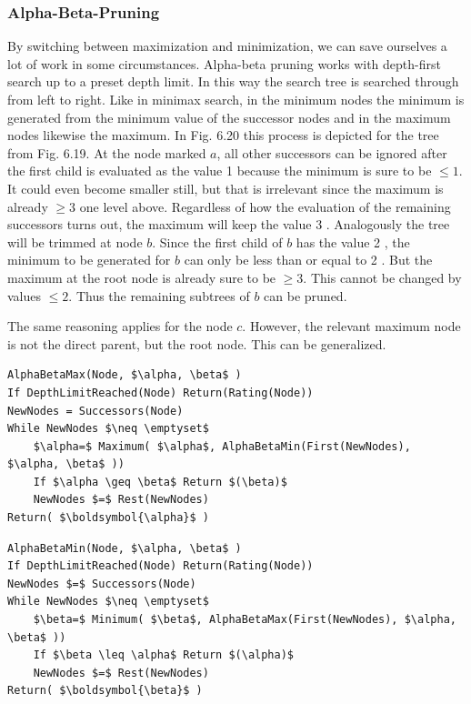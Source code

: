 \documentclass[10pt]{book}
\begin{document}
\subsubsection*{Alpha-Beta-Pruning}
By switching between maximization and minimization, we can save ourselves a lot of work in some circumstances. Alpha-beta pruning works with depth-first search up to a preset depth limit. In this way the search tree is searched through from left to right. Like in minimax search, in the minimum nodes the minimum is generated from the minimum value of the successor nodes and in the maximum nodes likewise the maximum. In Fig. 6.20 this process is depicted for the tree from Fig. 6.19. At the node marked $a$, all other successors can be ignored after the first child is evaluated as the value 1 because the minimum is sure to be $\leq 1$. It could even become smaller still, but that is irrelevant since the maximum is already $\geq 3$ one level above. Regardless of how the evaluation of the remaining successors turns out, the maximum will keep the value 3 . Analogously the tree will be trimmed at node $b$. Since the first child of $b$ has the value 2 , the minimum to be generated for $b$ can only be less than or equal to 2 . But the maximum at the root node is already sure to be $\geq 3$. This cannot be changed by values $\leq 2$. Thus the remaining subtrees of $b$ can be pruned.

The same reasoning applies for the node $c$. However, the relevant maximum node is not the direct parent, but the root node. This can be generalized.

\begin{verbatim}
AlphaBetaMax(Node, $\alpha, \beta$ )
If DepthLimitReached(Node) Return(Rating(Node))
NewNodes = Successors(Node)
While NewNodes $\neq \emptyset$
    $\alpha=$ Maximum( $\alpha$, AlphaBetaMin(First(NewNodes), $\alpha, \beta$ ))
    If $\alpha \geq \beta$ Return $(\beta)$
    NewNodes $=$ Rest(NewNodes)
Return( $\boldsymbol{\alpha}$ )
\end{verbatim}

\begin{verbatim}
AlphaBetaMin(Node, $\alpha, \beta$ )
If DepthLimitReached(Node) Return(Rating(Node))
NewNodes $=$ Successors(Node)
While NewNodes $\neq \emptyset$
    $\beta=$ Minimum( $\beta$, AlphaBetaMax(First(NewNodes), $\alpha, \beta$ ))
    If $\beta \leq \alpha$ Return $(\alpha)$
    NewNodes $=$ Rest(NewNodes)
Return( $\boldsymbol{\beta}$ )
\end{verbatim}
\end{document}
